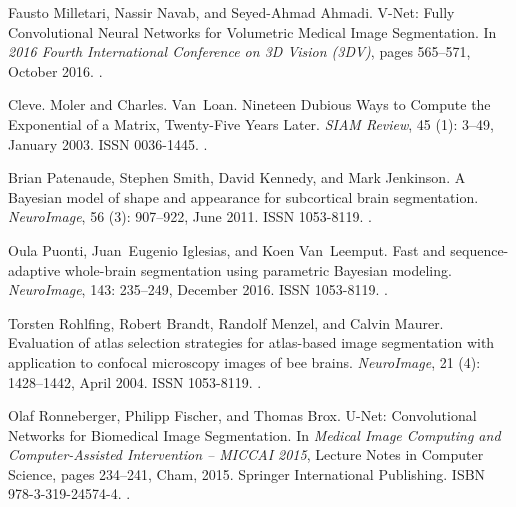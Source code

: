 \documentclass{midl}
\begin{document}
\begin{thebibliography}{50}
Fausto Milletari, Nassir Navab, and Seyed-Ahmad Ahmadi.
\newblock V-{Net}: {Fully} {Convolutional} {Neural} {Networks} for {Volumetric}
  {Medical} {Image} {Segmentation}.
\newblock In \emph{2016 {Fourth} {International} {Conference} on {3D} {Vision}
  ({3DV})}, pages 565--571, October 2016.
\newblock {}.

Cleve. Moler and Charles. Van~Loan.
\newblock Nineteen {Dubious} {Ways} to {Compute} the {Exponential} of a
  {Matrix}, {Twenty}-{Five} {Years} {Later}.
\newblock \emph{SIAM Review}, 45 (1): 3--49, January 2003.
\newblock ISSN 0036-1445.
\newblock {}.

Brian Patenaude, Stephen Smith, David Kennedy, and Mark Jenkinson.
\newblock A {Bayesian} model of shape and appearance for subcortical brain
  segmentation.
\newblock \emph{NeuroImage}, 56 (3): 907--922, June 2011.
\newblock ISSN 1053-8119.
\newblock {}.

Oula Puonti, Juan~Eugenio Iglesias, and Koen Van~Leemput.
\newblock Fast and sequence-adaptive whole-brain segmentation using parametric
  {Bayesian} modeling.
\newblock \emph{NeuroImage}, 143: 235--249, December 2016.
\newblock ISSN 1053-8119.
\newblock {}.

Torsten Rohlfing, Robert Brandt, Randolf Menzel, and Calvin Maurer.
\newblock Evaluation of atlas selection strategies for atlas-based image
  segmentation with application to confocal microscopy images of bee brains.
\newblock \emph{NeuroImage}, 21 (4): 1428--1442, April 2004.
\newblock ISSN 1053-8119.
\newblock {}.

Olaf Ronneberger, Philipp Fischer, and Thomas Brox.
\newblock U-{Net}: {Convolutional} {Networks} for {Biomedical} {Image}
  {Segmentation}.
\newblock In \emph{Medical {Image} {Computing} and {Computer}-{Assisted}
  {Intervention} – {MICCAI} 2015}, Lecture {Notes} in {Computer} {Science},
  pages 234--241, Cham, 2015. Springer International Publishing.
\newblock ISBN 978-3-319-24574-4.
\newblock {}.


\end{thebibliography}
\end{document}
